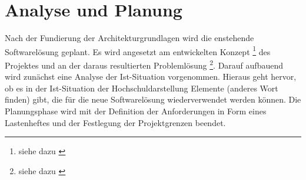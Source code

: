 \section{Analyse und Planung}
\label{sec:AnalyseUndPlanung}

Nach der Fundierung der Architekturgrundlagen wird die enstehende Softwarelösung geplant. Es wird angesetzt am 
entwickelten Konzept \footnote{siehe dazu \citet{fangmann2014}} des Projektes und an der daraus resultierten Problemlösung \footnote{siehe dazu \citet{fangmann2014}}. Darauf aufbauend wird zunächst eine Analyse der Ist-Situation vorgenommen. 
Hieraus geht hervor, ob es in der Ist-Situation der Hochschuldarstellung Elemente (anderes Wort finden) gibt, die für die 
neue Softwarelösung wiederverwendet werden können. Die Planungsphase wird mit der Definition der Anforderungen in 
Form eines Lastenheftes und der Festlegung der Projektgrenzen beendet.